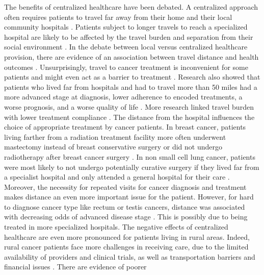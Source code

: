 The benefits of centralized healthcare have been debated. A centralized approach
often requires patients to travel far away from their home and their local
community hospitals \cite{woo_centralisation_2012}. Patients subject to longer
travels to reach a specialized hospital are likely to be affected by the travel
burden and separation from their social environment \cite{payne_impact_2000}. In
the debate between local versus centralized healthcare provision, there are
evidence of an association between travel distance and health outcomes
\cite{kelly_are_2016}. Unsurprisingly, travel to cancer treatment is
inconvenient for some patients and might even act as a barrier to treatment
\cite{payne_impact_2000}. Research also showed that patients who lived far from
hospitals and had to travel more than 50 miles had a more advanced stage at
diagnosis, lower adherence to encoded treatments, a worse prognosis, and a worse
quality of life \cite{ambroggi_distance_2015}. More research linked travel
burden with lower treatment compliance
\cite{dutta_evaluation_2013,guidry_transportation_1997}. The distance from the
hospital influences the choice of appropriate treatment by cancer patients. In
breast cancer, patients living farther from a radiation treatment facility more
often underwent mastectomy instead of breast conservative surgery
\cite{schroen_impact_2005,celaya_travel_2006,voti_treatment_2006,meden_relationship_2002,nattinger_relationship_2001,boscoe_geographic_2011}
or did not undergo radiotherapy after breast cancer surgery
\cite{satasivam_dilemma_2014,schroen_impact_2005,celaya_travel_2006}. In non
small cell lung cancer, patients were most likely to not undergo potentially
curative surgery if they lived far from a specialist hospital and only attended
a general hospital for their care \cite{tracey_patients_2015}. Moreover, the
necessity for repeated visits for cancer diagnosis and treatment makes distance
an even more important issue for the patient\cite{guidry_transportation_1997}.
However, for hard to diagnose cancer type like rectum or testis cancers,
distance was associated with decreasing odds of advanced disease stage
\cite{virgilsen_travel_2019}. This is possibly due to being treated in more
specialized hospitals. The negative effects of centralized healthcare are even
more pronounced for patients living in rural areas. Indeed, rural cancer
patients face more challenges in receiving care, due to the limited availability
of providers and clinical trials, as well as transportation barriers and
financial issues \cite{charlton_challenges_2015}. There are evidence of poorer
